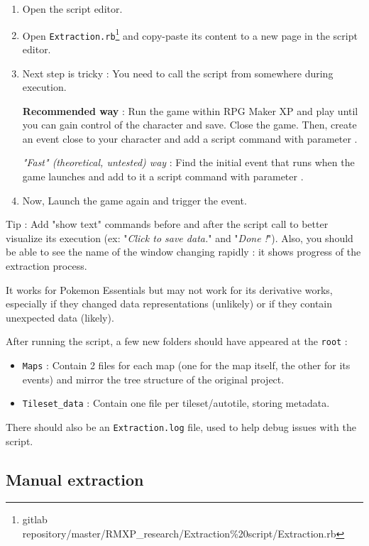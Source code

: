 \documentclass[11pt]{article}
\begin{document}
{\begin{enumerate}
	\item Open the script editor.
	
	\item Open \verb|Extraction.rb|\footnote{gitlab repository/master/RMXP\_research/Extraction\%20script/Extraction.rb} and copy-paste its content to a new page in the script editor.
	
	\item Next step is tricky : You need to call the script from somewhere during execution. 
	
	\textbf{Recommended way} : Run the game within RPG Maker XP and play until you can gain control of the character and save. Close the game. Then, create an event close to your character and add a script command with parameter . 
	
	\textit{"Fast" (theoretical, untested) way} : Find the initial event that runs when the game launches and add to it a script command with parameter .
	
	\item Now, Launch the game again and trigger the event.
\end{enumerate}

Tip : Add "show text" commands before and after the script call to better visualize its execution (ex: "\textit{Click to save data.}" and "\textit{Done !}"). Also, you should be able to see the name of the window changing rapidly : it shows progress of the extraction process.

It works for Pokemon Essentials but may not work for its derivative works, especially if they changed data representations (unlikely) or if they contain unexpected data (likely).

After running the script, a few new folders should have appeared at the \texttt{root} :
\begin{itemize}
	\item \verb|Maps| : Contain 2 files for each map (one for the map itself, the other for its events) and mirror the tree structure of the original project.
	\item \verb|Tileset_data| : Contain one file per tileset/autotile, storing metadata.
\end{itemize}

There should also be an \verb|Extraction.log| file, used to help debug issues with the script.


\newpage

\subsection{Manual extraction}

}
\end{document}
